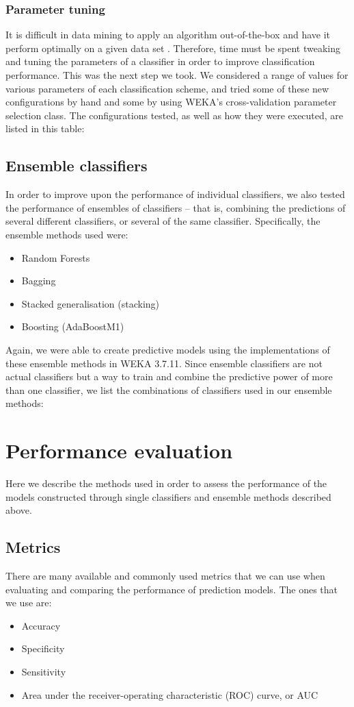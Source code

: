 \subsubsection{Parameter tuning}
It is difficult in data mining to apply an algorithm out-of-the-box and have
it perform optimally on a given data set \citep{Witten2005}. Therefore, time
must be spent tweaking and tuning the parameters of a classifier in order to
improve classification performance. This was the next step we took. We
considered a range of values for various parameters of each classification
scheme, and tried some of these new configurations by hand and some by using
WEKA's cross-validation parameter selection class. The configurations tested,
as well as how they were executed, are listed in this table:

\subsection{Ensemble classifiers}
In order to improve upon the performance of individual classifiers, we also
tested the performance of ensembles of classifiers -- that is, combining the
predictions of several different classifiers, or several of the same
classifier. Specifically, the ensemble methods used were:
\begin{itemize}
  \item Random Forests
  \item Bagging
  \item Stacked generalisation (stacking)
  \item Boosting (AdaBoostM1)
\end{itemize}

Again, we were able to create predictive models using the implementations of
these ensemble methods in WEKA 3.7.11. Since ensemble classifiers are not
actual classifiers but a way to train and combine the predictive power of more
than one classifier, we list the combinations of classifiers used in our
ensemble methods:

\section{Performance evaluation} %
\label{sec:perfeval}
Here we describe the methods used in order to assess the performance of the
models constructed through single classifiers and ensemble methods described
above.

\subsection{Metrics}
There are many available and commonly used metrics that we can use when
evaluating and comparing the performance of prediction models. The ones that
we use are: 
\begin{itemize}
  \item Accuracy
  \item Specificity
  \item Sensitivity
  \item Area under the receiver-operating characteristic (ROC) curve, or AUC
\end{itemize}

